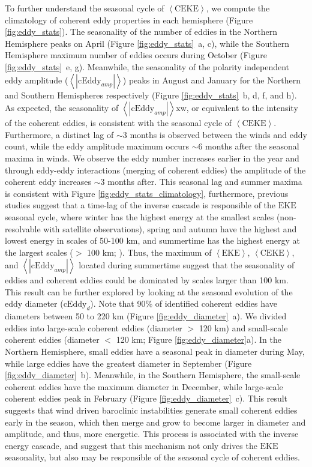 \documentclass[draft,linenumbers]{agujournal2019}
\newcommand{\EKE}{\textrm{EKE}}
\newcommand{\CEKE}{\textrm{CEKE}}
\newcommand{\cEddy}{\textrm{cEddy}}
\begin{document}
	To further understand the seasonal cycle of $\left<\CEKE\right>$, we compute the climatology of coherent eddy properties in each hemisphere (Figure \ref{fig:eddy_stats}). 
	The seasonality of the number of eddies in the Northern Hemisphere peaks on April (Figure \ref{fig:eddy_stats}~a, c), while the Southern Hemisphere maximum number of eddies occurs during October (Figure \ref{fig:eddy_stats}~e, g). 
	Meanwhile, the seasonality of the polarity independent eddy amplitude ($\left<|\cEddy_{amp}|\right>$) peaks in August and January for the Northern and Southern Hemispheres respectively (Figure \ref{fig:eddy_stats}~b, d, f, and h). 
	As expected, the seasonality of $\left<|\cEddy_{amp}|\right>$xw, or equivalent to the intensity of the coherent eddies, is consistent with the seasonal cycle of $\left<\CEKE\right>$. 
	Furthermore, a distinct lag of $\sim$3 months is observed between the winds and eddy count, while the eddy amplitude maximum occurs $\sim$6 months after the seasonal maxima in winds. 
	We observe the eddy number increases earlier in the year and through eddy-eddy interactions (merging of coherent eddies) the amplitude of the coherent eddy increases $\sim$3 months after. This seasonal lag and summer maxima is consistent with Figure \ref{fig:eddy_stats_climatology}, furthermore, previous studies suggest that a time-lag of the inverse cascade \citep{Sasaki_seasonal_2014, Qiu_seasonal_2014} is responsible of the $\EKE$ seasonal cycle, where winter has the highest energy at the smallest scales (non-resolvable with satellite observations), spring and autumn have the highest and lowest energy in scales of 50-100 km, and summertime has the highest energy at the largest scales ($>$ 100 km; \citealt{Uchida_Seasonality_2017}). 
	Thus, the maximum of $\left<\EKE\right>$, $\left<\CEKE\right>$, and $\left<|\cEddy_{amp}|\right>$ located during summertime suggest that the seasonality of eddies and coherent eddies could be dominated by scales larger than 100 km.
	This result can be further explored by looking at the seasonal evolution of the eddy diameter ($\cEddy_d$). Note that 90\% of identified coherent eddies have diameters between 50 to 220 km (Figure \ref{fig:eddy_diameter}~a). We divided eddies into large-scale coherent eddies (diameter $>$ 120 km) and  small-scale coherent eddies (diameter $<$ 120 km; Figure \ref{fig:eddy_diameter}a). In the Northern Hemisphere, small eddies have a seasonal peak in diameter during May, while large eddies have the greatest diameter in September (Figure \ref{fig:eddy_diameter}~b).
	Meanwhile, in the Southern Hemisphere, the small-scale coherent eddies have the maximum diameter in December, while large-scale coherent eddies peak in 
	February (Figure \ref{fig:eddy_diameter}~c). This result suggests that wind driven baroclinic instabilities generate small coherent eddies early in the season, which then merge and grow to become larger in diameter and amplitude, and thus, more energetic. This process is associated with the inverse energy cascade, and suggest that this mechanism not only drives the $\EKE$ seasonality, but also may be responsible of the seasonal cycle of coherent eddies. 
\end{document}
